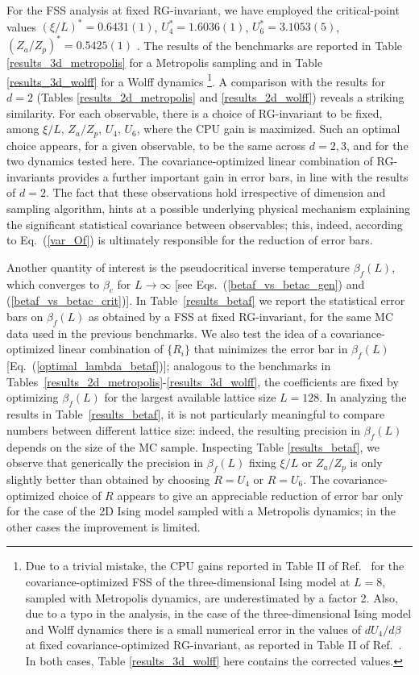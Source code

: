\documentclass[pre,twocolumn]{revtex4-2}
\begin{document}
For the FSS analysis at fixed RG-invariant, we have employed the critical-point values
$(\xi/L)^*=0.6431(1)$, $U_4^*=1.6036(1)$, $U_6^*=3.1053(5)$, $(Z_a / Z_p)^*=0.5425(1)$ \cite{Hasenbusch-10}.
The results of the benchmarks are reported in Table \ref{results_3d_metropolis} for a Metropolis sampling and in Table \ref{results_3d_wolff} for a Wolff dynamics
\footnote{Due to a trivial mistake, the CPU gains reported in Table II of Ref.~\cite{PT-11} for the covariance-optimized FSS
of the three-dimensional Ising model at $L=8$, sampled with Metropolis dynamics, are underestimated by a factor 2.
Also, due to a typo in the analysis, in the case of the three-dimensional Ising model and Wolff dynamics there is a small numerical error in the values of $dU_4/d\beta$ at fixed covariance-optimized RG-invariant,
as reported in Table II of Ref.~\cite{PT-11}.
In both cases, Table \ref{results_3d_wolff} here contains the corrected values.
}.
A comparison with the results for $d=2$ (Tables \ref{results_2d_metropolis} and \ref{results_2d_wolff}) reveals a striking similarity.
For each observable, there is a choice of RG-invariant to be fixed, among $\xi/L$, $Z_a/Z_p$, $U_4$, $U_6$, where the CPU gain is maximized.
Such an optimal choice appears, for a given observable, to be the same across $d=2,3$, and for the two dynamics tested here.
The covariance-optimized linear combination of RG-invariants provides a further important gain in error bars, in line with the results of $d=2$.
The fact that these
observations hold irrespective of dimension and sampling algorithm,
hints at a possible underlying physical mechanism explaining the significant statistical covariance between observables; this, indeed, according to Eq.~(\ref{var_Of}) is ultimately responsible for the reduction of error bars.

Another quantity of interest is the pseudocritical inverse temperature $\beta_f(L)$, which converges to $\beta_c$ for $L\rightarrow\infty$ [see Eqs.~(\ref{betaf_vs_betac_gen}) and (\ref{betaf_vs_betac_crit})].
In Table~\ref{results_betaf} we report the statistical error bars on $\beta_f(L)$ as obtained by a FSS at fixed RG-invariant, for the same MC data used in the previous benchmarks.
We also test the idea of a covariance-optimized linear combination of $\{R_i\}$ that minimizes the error bar in $\beta_f(L)$ [Eq.~(\ref{optimal_lambda_betaf})]; analogous to the benchmarks in Tables~\ref{results_2d_metropolis}-\ref{results_3d_wolff}, the coefficients are fixed by optimizing $\beta_f(L)$ for the largest available lattice size $L=128$.
In analyzing the results in Table~\ref{results_betaf}, it is not particularly meaningful to compare numbers between different lattice size: indeed, the resulting precision in $\beta_f(L)$ depends on the size of the MC sample.
Inspecting Table \ref{results_betaf}, we observe that generically the precision in $\beta_f(L)$ fixing $\xi/L$ or $Z_a / Z_p$ is only slightly better than obtained by choosing $R=U_4$ or $R=U_6$.
The covariance-optimized choice of $R$ appears to give an appreciable reduction of error bar only for the case of the 2D Ising model sampled with a Metropolis dynamics; in the other cases the improvement is limited.
\end{document}
